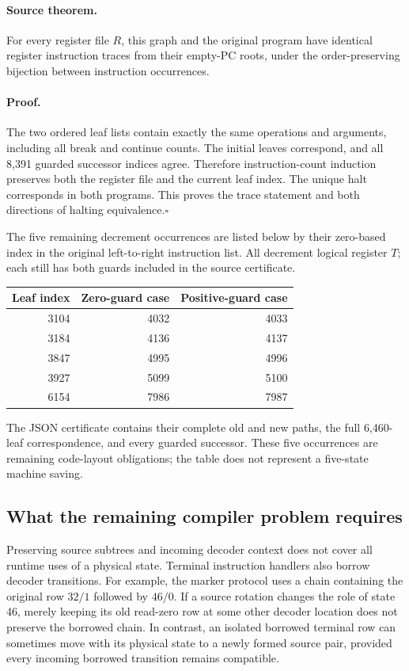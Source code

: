 \paragraph{Source theorem.}
For every register file $R$, this graph and the original program have
identical register instruction traces from their empty-PC roots, under
the order-preserving bijection between instruction occurrences.

\paragraph{Proof.}
The two ordered leaf lists contain exactly the same operations and
arguments, including all break and continue counts.  The initial leaves
correspond, and all 8,391 guarded successor indices agree.  Therefore
instruction-count induction preserves both the register file and the
current leaf index.  The unique halt corresponds in both programs.
This proves the trace statement and both directions of halting
equivalence.\hfill$\square$

The five remaining decrement occurrences are listed below by their
zero-based index in the original left-to-right instruction list.  All
decrement logical register $T$; each still has both guards included in
the source certificate.
\begin{center}
\begin{tabular}{rrr}
Leaf index & Zero-guard case & Positive-guard case\\\hline
3104&4032&4033\\
3184&4136&4137\\
3847&4995&4996\\
3927&5099&5100\\
6154&7986&7987
\end{tabular}
\end{center}
The JSON certificate contains their complete old and new paths, the full
6,460-leaf correspondence, and every guarded successor.  These five
occurrences are remaining code-layout obligations; the table does not
represent a five-state machine saving.

\subsection{What the remaining compiler problem requires}

Preserving source subtrees and incoming decoder context does not cover
all runtime uses of a physical state.  Terminal instruction handlers
also borrow decoder transitions.  For example, the marker protocol
uses a chain containing the original row $32/1$ followed by $46/0$.
If a source rotation changes the role of state 46, merely keeping its
old read-zero row at some other decoder location does not preserve the
borrowed chain.  In contrast, an isolated borrowed terminal row can
sometimes move with its physical state to a newly formed source pair,
provided every incoming borrowed transition remains compatible.

